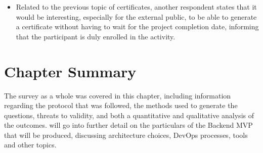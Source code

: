 \begin{itemize}

\item Related to the previous topic of certificates, another respondent states that it would be interesting, especially for the external public, to be able to generate a certificate without having to wait for the project completion date, informing that the participant is duly enrolled in the activity.
\end{itemize}

\section{Chapter Summary}

The survey as a whole was covered in this chapter, including information regarding the protocol that was followed, the methods used to generate the questions, threats to validity, and both a quantitative and qualitative analysis of the outcomes.  will go into further detail on the particulars of the Backend MVP that will be produced, discussing architecture choices, DevOps processes, tools and other topics.
